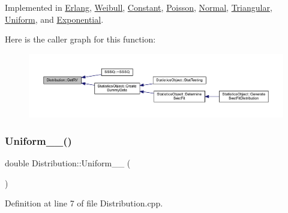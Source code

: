 Implemented in \hyperlink{class_erlang_a5ae5b56e37bd2c5ee4318fcc12259442}{Erlang}, \hyperlink{class_weibull_a0de3910ff51aeb87c49ccb5d34d1de0d}{Weibull}, \hyperlink{class_constant_a9eac5a0bdc360c859f187f8aa94dcd6d}{Constant}, \hyperlink{class_poisson_a068964aa05df4051b23a84d71529fb69}{Poisson}, \hyperlink{class_normal_a6101d2303601a4f7dfa33fe4b104df7e}{Normal}, \hyperlink{class_triangular_aadd53c452801be8c0eb6ffb31a299835}{Triangular}, \hyperlink{class_uniform_a9350886d5ad1854294ecff338a288fc7}{Uniform}, and \hyperlink{class_exponential_a2a45aeaf0a3725174d86712761a8dd82}{Exponential}.

Here is the caller graph for this function\+:
\nopagebreak
\begin{figure}[H]
\begin{center}
\leavevmode
\includegraphics[width=350pt]{class_distribution_a63b433850d7b47d84eb69448f7916719_icgraph}
\end{center}
\end{figure}
\mbox{\label{class_distribution_a33965648e4c6d3bbc93c61ccd3897c98}} 
\subsubsection{\texorpdfstring{Uniform\+\_\+\_()}{Uniform\_0\_1()}}
{\footnotesize\ttfamily double Distribution\+::\+Uniform\+\_\+\_ (\begin{DoxyParamCaption}{ }\end{DoxyParamCaption})\hspace{0.3cm}{\ttfamily [protected]}}



Definition at line 7 of file Distribution.\+cpp.


